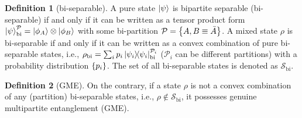 \documentclass[
aps,
pra,
twocolumn,
floatfix,
]{revtex4-2}
\theoremstyle{plain}
\theoremstyle{definition}
\newtheorem{definition}{Definition}
\newcommand{\dm}{\rho}
\newcommand{\bi}{\text{bi}}
\newcommand{\separable}{\mathcal{S}}
\newcommand{\ppartition}{\mathcal{P}}
\begin{document}
\begin{definition}[bi-separable]\label{def:bipartite_separable}
	A pure state $\ket{\psi}$ is bipartite separable (bi-separable) if and only if it can be written as a tensor product form 
	$\ket{\psi}_{\bi}^{\ppartition} = \ket{\phi_{A}}\otimes\ket{\phi_{B}}$ with some bi-partition $\ppartition=\qty{A,B\equiv \bar{A}}$. 
	A mixed state $\dm$ is bi-separable if and only if it can be written as a convex combination of pure bi-separable states, i.e.,
	$\dm_{\bi}=\sum_i p_i \op{\psi_i}_\bi^{\ppartition_i}$ 
	($\ppartition_i$ can be different partitions)
	with a probability distribution $\qty{p_i}$.
	The set of all bi-separable states is denoted as $\separable_\bi$.
\end{definition}
\begin{definition}[GME]\label{def:gme}
	On the contrary, if a state $\dm$ is not a convex combination of any (partition) bi-separable states,
	i.e., $\dm\notin \separable_\bi$,
	it possesses genuine multipartite entanglement (GME).
\end{definition}
\end{document}

